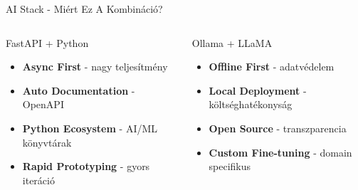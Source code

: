 \documentclass[aspectratio=169,10pt]{beamer}
\newcommand{\highlight}[1]{\textcolor{virtplc-blue}{\textbf{#1}}}
\begin{document}
\begin{frame}{AI Stack - Miért Ez A Kombináció?}
    \begin{columns}[c]
        \begin{block}{FastAPI + Python}
            \begin{itemize}
                \item \highlight{Async First} - nagy teljesítmény
                \item \highlight{Auto Documentation} - OpenAPI
                \item \highlight{Python Ecosystem} - AI/ML könyvtárak
                \item \highlight{Rapid Prototyping} - gyors iteráció
            \end{itemize}
        \end{block}
        
        \begin{block}{Ollama + LLaMA}
            \begin{itemize}
                \item \highlight{Offline First} - adatvédelem
                \item \highlight{Local Deployment} - költséghatékonyság
                \item \highlight{Open Source} - transzparencia
                \item \highlight{Custom Fine-tuning} - domain specifikus
            \end{itemize}
        \end{block}
    \end{columns}
\end{frame}
\end{document}
